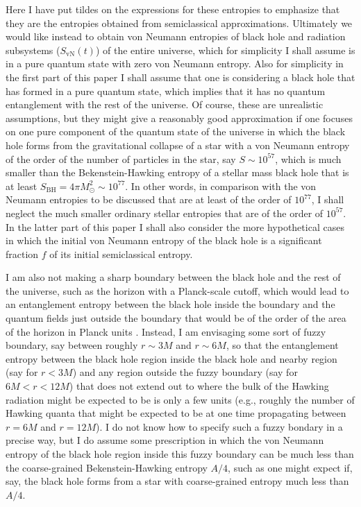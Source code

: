 \documentclass[12pt]{article}
\begin{document}
Here I have put tildes on the expressions for these entropies to emphasize that they are the entropies obtained from semiclassical approximations.  Ultimately we would like instead to obtain von Neumann entropies of black hole and radiation subsystems ($S_\mathrm{vN}(t)$) of the entire universe, which for simplicity I shall assume is in a pure quantum state with zero von Neumann entropy.  Also for simplicity in the first part of this paper I shall assume that one is considering a black hole that has formed in a pure quantum state, which implies that it has no quantum entanglement with the rest of the universe.  Of course, these are unrealistic assumptions, but they might give a reasonably good approximation if one focuses on one pure component of the quantum state of the universe in which the black hole forms from the gravitational collapse of a star with a von Neumann entropy of the order of the number of particles in the star, say $S \sim 10^{57}$, which is much smaller than the Bekenstein-Hawking entropy of a stellar mass black hole that is at least $S_\mathrm{BH} = 4\pi M_\odot^2 \sim 10^{77}$.  In other words, in comparison with the von Neumann entropies to be discussed that are at least of the order of $10^{77}$, I shall neglect the much smaller ordinary stellar entropies that are of the order of $10^{57}$.  In the latter part of this paper I shall also consider the more hypothetical cases in which the initial von Neumann entropy of the black hole is a significant fraction $f$ of its initial semiclassical entropy.

I am also not making a sharp boundary between the black hole and the rest of the universe, such as the horizon with a Planck-scale cutoff, which would lead to an entanglement entropy between the black hole inside the boundary and the quantum fields just outside the boundary that would be of the order of the area of the horizon in Planck units \cite{Sorkin:1985bu,Bombelli:1986rw,Srednicki:1993im}.  Instead, I am envisaging some sort of fuzzy boundary, say between roughly $r \sim 3M$ and $r \sim 6M$, so that the entanglement entropy between the black hole region inside the black hole and nearby region (say for $r < 3M$) and any region outside the fuzzy boundary (say for $6M < r < 12M$) that does not extend out to where the bulk of the Hawking radiation might be expected to be is only a few units (e.g., roughly the number of Hawking quanta that might be expected to be at one time propagating between $r = 6M$ and $r = 12M$).  I do not know how to specify such a fuzzy bondary in a precise way, but I do assume some prescription in which the von Neumann entropy of the black hole region inside this fuzzy boundary can be much less than the coarse-grained Bekenstein-Hawking entropy $A/4$, such as one might expect if, say, the black hole forms from a star with coarse-grained entropy much less than $A/4$.
\end{document}
